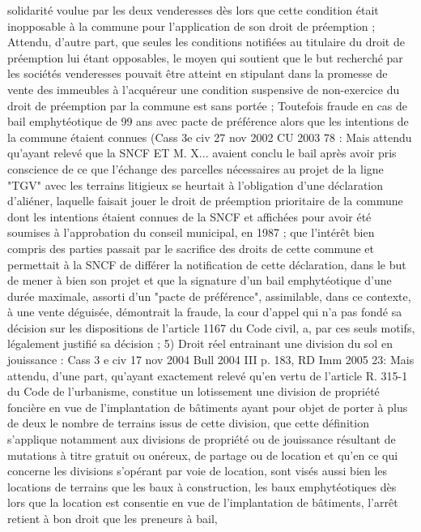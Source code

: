 \documentclass[11pt,a4paper]{report}
\begin{document}
	solidarité voulue par les deux venderesses dès lors que cette condition était inopposable à la commune pour
	l'application de son droit de préemption ;
	Attendu, d'autre part, que seules les conditions notifiées au titulaire du droit de préemption lui étant opposables,
	le moyen qui soutient que le but recherché par les sociétés venderesses pouvait être atteint en stipulant dans la
	promesse de vente des immeubles à l'acquéreur une condition suspensive de non-exercice du droit de préemption
	par la commune est sans portée ;
	Toutefois fraude en cas de bail emphytéotique de 99 ans avec pacte de préférence alors que les intentions de la
	commune étaient connues (Cass 3e civ 27 nov 2002 CU 2003 78 : Mais attendu qu'ayant relevé que la SNCF ET
	M. X... avaient conclu le bail après avoir pris conscience de ce que l'échange des parcelles nécessaires au projet
	de la ligne "TGV" avec les terrains litigieux se heurtait à l'obligation d'une déclaration d'aliéner, laquelle faisait
	jouer le droit de préemption prioritaire de la commune dont les intentions étaient connues de la SNCF et
	affichées pour avoir été soumises à l'approbation du conseil municipal, en 1987 ; que l'intérêt bien compris des
	parties passait par le sacrifice des droits de cette commune et permettait à la SNCF de différer la notification de
	cette déclaration, dans le but de mener à bien son projet et que la signature d'un bail emphytéotique d'une durée
	maximale, assorti d'un "pacte de préférence", assimilable, dans ce contexte, à une vente déguisée, démontrait la
	fraude, la cour d'appel qui n'a pas fondé sa décision sur les dispositions de l'article 1167 du Code civil, a, par
	ces seuls motifs, légalement justifié sa décision ;
	5) Droit réel entrainant une division du sol en jouissance : Cass 3 e civ 17 nov 2004 Bull 2004 III  p.
	183, RD Imm 2005 23: Mais attendu, d'une part, qu'ayant exactement relevé qu'en vertu de l'article R. 315-1 du
	Code de l'urbanisme, constitue un lotissement une division de propriété foncière en vue de l'implantation de
	bâtiments ayant pour objet de porter à plus de deux le nombre de terrains issus de cette division, que cette
	définition s'applique notamment aux divisions de propriété ou de jouissance résultant de mutations à titre gratuit
	ou onéreux, de partage ou de location et qu'en ce qui concerne les divisions s'opérant par voie de location, sont
	visés aussi bien les locations de terrains que les baux à construction, les baux emphytéotiques dès lors que la
	location est consentie en vue de l'implantation de bâtiments, l'arrêt retient à bon droit que les preneurs à bail,
\end{document}
